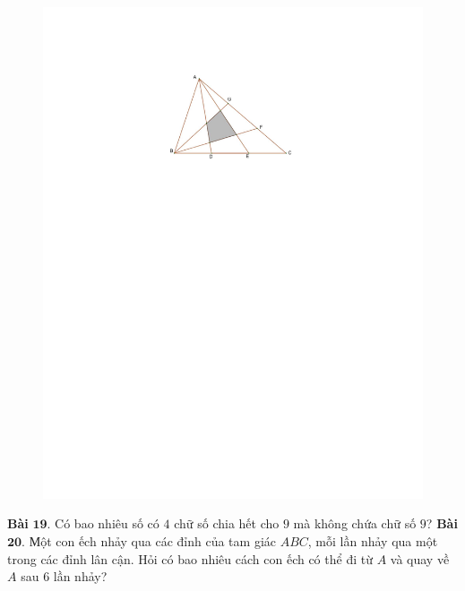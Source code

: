 \begin{multicols}{2}
\begin{figure}[H]
		\includegraphics[width= 1\linewidth]{bai18}
		\vspace*{-10pt}
	\end{figure}
	\textbf{\color{toancuabi}Bài} $\pmb{19.}$ Có bao nhiêu số có $4$ chữ số chia hết cho $9$ mà không chứa chữ số $9$?
	\vskip 0.1cm
	\textbf{\color{toancuabi}Bài} $\pmb{20.}$ Мột con ếch nhảy qua các đỉnh của tam giác $ABC$, mỗi lần nhảy qua một trong các đỉnh lân cận. Hỏi có bao nhiêu cách con ếch có thể đi từ $A$ và quay về $A$ sau $6$ lần nhảy?
\end{multicols}